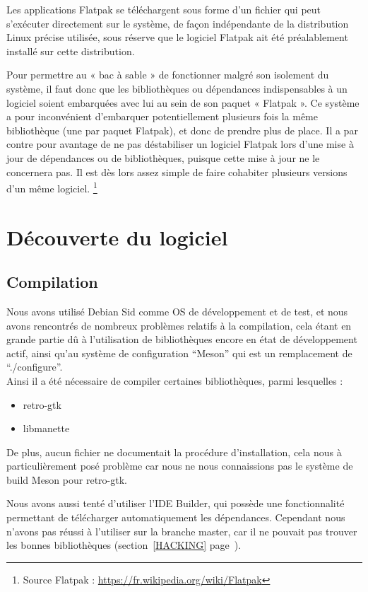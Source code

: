 \documentclass[12pt]{report}
\begin{document}
Les applications Flatpak se téléchargent sous forme d'un fichier qui
peut s’exécuter directement sur le système, de façon indépendante de
la distribution Linux précise utilisée, sous réserve que le logiciel
Flatpak ait été préalablement installé sur cette distribution.

Pour permettre au « bac à sable » de fonctionner malgré son isolement
du système, il faut donc que les bibliothèques ou dépendances
indispensables à un logiciel soient embarquées avec lui au sein de son
paquet « Flatpak ». Ce système a pour inconvénient d'embarquer
potentiellement plusieurs fois la même bibliothèque (une par paquet
Flatpak), et donc de prendre plus de place. Il a par contre pour
avantage de ne pas déstabiliser un logiciel Flatpak lors d'une mise à
jour de dépendances ou de bibliothèques, puisque cette mise à jour ne
le concernera pas. Il est dès lors assez simple de faire cohabiter
plusieurs versions d'un même logiciel.
\footnote{Source Flatpak : \url{https://fr.wikipedia.org/wiki/Flatpak}}

\section{Découverte du logiciel}
\subsection{Compilation}
Nous avons utilisé Debian Sid comme OS de développement et de test,
et nous avons rencontrés de nombreux problèmes relatifs à la compilation,
cela étant en grande partie dû à l'utilisation de bibliothèques encore en
état de développement actif, ainsi qu'au système de configuration
``Meson'' qui est un remplacement de ``./configure''.\\

Ainsi il a été nécessaire de compiler certaines bibliothèques, parmi
lesquelles :
\begin{itemize}
\item retro-gtk
\item libmanette\\
\end{itemize}

De plus, aucun fichier ne documentait la procédure d'installation,
cela nous à particulièrement posé problème car nous ne nous
connaissions pas le système de build Meson
pour retro-gtk.

Nous avons aussi tenté d'utiliser l'IDE Builder, qui possède une
fonctionnalité permettant de télécharger automatiquement les
dépendances. Cependant nous n'avons pas réussi à l'utiliser sur la branche master,
car il ne pouvait pas trouver les bonnes bibliothèques (section~\ref{HACKING}
page~\pageref{HACKING}).
\end{document}
